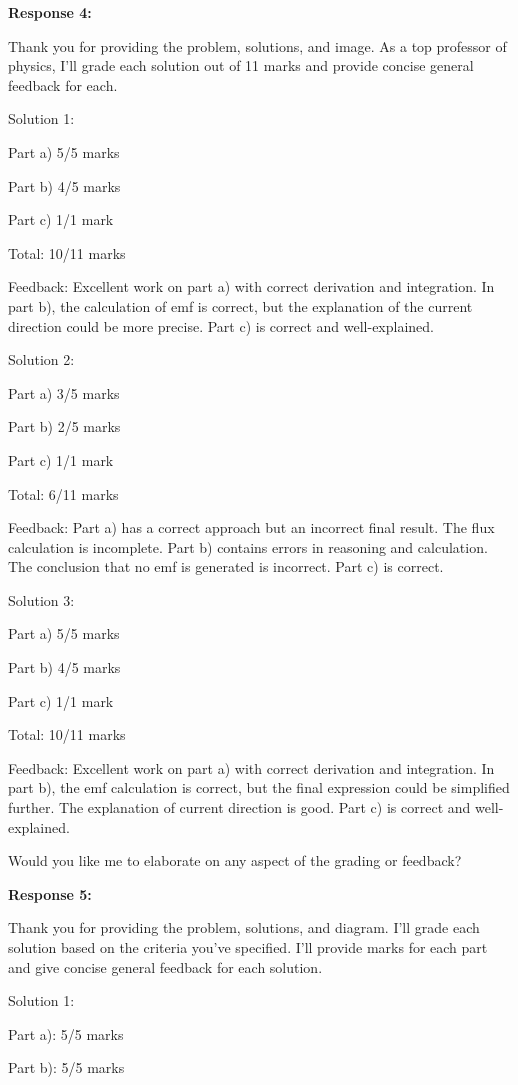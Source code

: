\documentclass[a4paper,11pt]{article}
\begin{document}
\bigskip
\textbf{Response 4:}

Thank you for providing the problem, solutions, and image. As a top professor of physics, I'll grade each solution out of 11 marks and provide concise general feedback for each.

Solution 1:

Part a) 5/5 marks

Part b) 4/5 marks

Part c) 1/1 mark

Total: 10/11 marks

Feedback: Excellent work on part a) with correct derivation and integration. In part b), the calculation of emf is correct, but the explanation of the current direction could be more precise. Part c) is correct and well-explained.

Solution 2:

Part a) 3/5 marks

Part b) 2/5 marks

Part c) 1/1 mark

Total: 6/11 marks

Feedback: Part a) has a correct approach but an incorrect final result. The flux calculation is incomplete. Part b) contains errors in reasoning and calculation. The conclusion that no emf is generated is incorrect. Part c) is correct.

Solution 3:

Part a) 5/5 marks

Part b) 4/5 marks

Part c) 1/1 mark

Total: 10/11 marks

Feedback: Excellent work on part a) with correct derivation and integration. In part b), the emf calculation is correct, but the final expression could be simplified further. The explanation of current direction is good. Part c) is correct and well-explained.

Would you like me to elaborate on any aspect of the grading or feedback?

\bigskip
\textbf{Response 5:}

Thank you for providing the problem, solutions, and diagram. I'll grade each solution based on the criteria you've specified. I'll provide marks for each part and give concise general feedback for each solution.

Solution 1:

Part a): 5/5 marks

Part b): 5/5 marks
\end{document}

